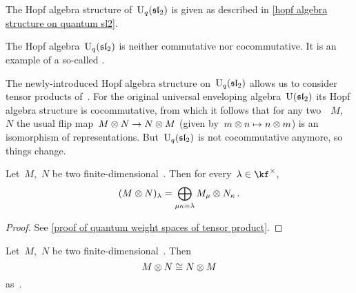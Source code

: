 \documentclass[a4paper, 11pt, oneside]{scrartcl}
\begin{document}
\begin{definition}
  The Hopf algebra structure of~$\operatorname{U}_q(\mathfrak{sl}_2)$ is given as described in \cref{hopf algebra structure on quantum sl2}.
\end{definition}

\begin{remark}
      The Hopf algebra~$\operatorname{U}_q(\mathfrak{sl}_2)$ is neither commutative nor cocommutative.
      It is an example of a so-called .
\end{remark}

The newly-introduced Hopf algebra structure on~$\operatorname{U}_q(\mathfrak{sl}_2)$ allows us to consider tensor products of~.
For the original universal enveloping algebra~$\operatorname{U}(\mathfrak{sl}_2)$ its Hopf algebra structure is cocommutative, from which it follows that for any two~~$M$,~$N$ the usual flip map~$M \otimes N \to N \otimes M$ (given by~$m \otimes n \mapsto n \otimes m$) is an isomorphism of representations.
But~$\operatorname{U}_q(\mathfrak{sl}_2)$ is not cocommutative anymore, so things change.

\begin{lemma}
  \label{quantum weight spaces of tensor product}
  Let~$M$,~$N$ be two finite-dimensional~.
  Then for every~$\lambda \in \kf^\times$,
  \[
    (M \otimes N)_\lambda
    =
    \bigoplus_{\mu \kappa = \lambda}
    M_\mu \otimes N_\kappa \,.
  \]
\end{lemma}

\begin{proof}
  See \cref{proof of quantum weight spaces of tensor product}.
\end{proof}

\begin{corollary}
  Let~$M$,~$N$ be two finite-dimensional~.
  Then
  \[
    M \otimes N
    \cong
    N \otimes M
  \]
  as~.
\end{corollary}
\end{document}
